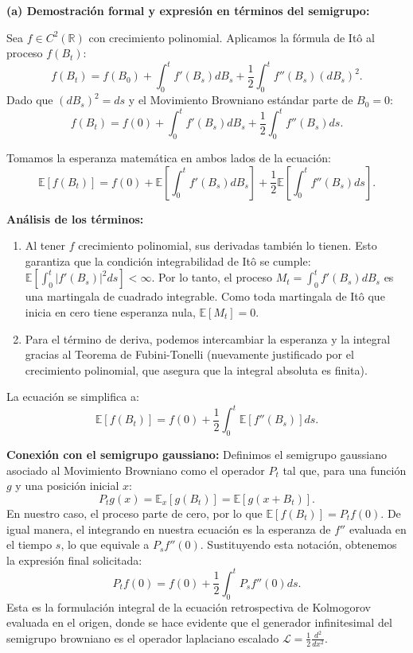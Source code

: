 \documentclass[11pt, letterpaper]{article}
\begin{document}
\begin{solucion}
    \vspace{3mm}
    \textbf{(a) Demostración formal y expresión en términos del semigrupo:}

    Sea $f \in C^2(\mathbb{R})$ con crecimiento polinomial. Aplicamos la fórmula de Itô al proceso $f(B_t)$:
    \[ f(B_t) = f(B_0) + \int_0^t f'(B_s) dB_s + \frac{1}{2} \int_0^t f''(B_s) (dB_s)^2. \]
    Dado que $(dB_s)^2 = ds$ y el Movimiento Browniano estándar parte de $B_0 = 0$:
    \[ f(B_t) = f(0) + \int_0^t f'(B_s) dB_s + \frac{1}{2} \int_0^t f''(B_s) ds. \]
    
    Tomamos la esperanza matemática en ambos lados de la ecuación:
    \[ \mathbb{E}[f(B_t)] = f(0) + \mathbb{E}\left[ \int_0^t f'(B_s) dB_s \right] + \frac{1}{2} \mathbb{E}\left[ \int_0^t f''(B_s) ds \right]. \]
    
    \textbf{Análisis de los términos:}
    \begin{enumerate}
        \item Al tener $f$ crecimiento polinomial, sus derivadas también lo tienen. Esto garantiza que la condición integrabilidad de Itô se cumple: $\mathbb{E}\left[ \int_0^t |f'(B_s)|^2 ds \right] < \infty$. Por lo tanto, el proceso $M_t = \int_0^t f'(B_s) dB_s$ es una martingala de cuadrado integrable. Como toda martingala de Itô que inicia en cero tiene esperanza nula, $\mathbb{E}[M_t] = 0$.
        \item Para el término de deriva, podemos intercambiar la esperanza y la integral gracias al Teorema de Fubini-Tonelli (nuevamente justificado por el crecimiento polinomial, que asegura que la integral absoluta es finita).
    \end{enumerate}
    
    La ecuación se simplifica a:
    \[ \mathbb{E}[f(B_t)] = f(0) + \frac{1}{2} \int_0^t \mathbb{E}[f''(B_s)] ds. \]
    
    \textbf{Conexión con el semigrupo gaussiano:}
    Definimos el semigrupo gaussiano asociado al Movimiento Browniano como el operador $P_t$ tal que, para una función $g$ y una posición inicial $x$:
    \[ P_t g(x) = \mathbb{E}_x[g(B_t)] = \mathbb{E}[g(x + B_t)]. \]
    En nuestro caso, el proceso parte de cero, por lo que $\mathbb{E}[f(B_t)] = P_t f(0)$.
    De igual manera, el integrando en nuestra ecuación es la esperanza de $f''$ evaluada en el tiempo $s$, lo que equivale a $P_s f''(0)$.
    Sustituyendo esta notación, obtenemos la expresión final solicitada:
    \[ P_t f(0) = f(0) + \frac{1}{2} \int_0^t P_s f''(0) ds. \]
    Esta es la formulación integral de la ecuación retrospectiva de Kolmogorov evaluada en el origen, donde se hace evidente que el generador infinitesimal del semigrupo browniano es el operador laplaciano escalado $\mathcal{L} = \frac{1}{2}\frac{d^2}{dx^2}$.
\end{solucion}
\end{document}
